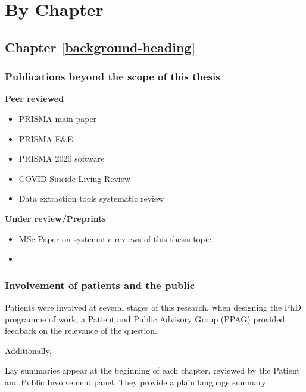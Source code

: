 \documentclass[a4paper, twoside]{templates/ociamthesis}
\begin{document}
\startappendices

\hypertarget{chapter-appendix-heading}{%
\chapter{By Chapter}\label{chapter-appendix-heading}}

\hypertarget{appendix-into}{%
\section{Chapter \ref{background-heading}}\label{appendix-into}}

\hypertarget{appendix-publications}{%
\subsection{Publications beyond the scope of this thesis}\label{appendix-publications}}

\textbf{Peer reviewed}

\begin{itemize}
\item
  PRISMA main paper
\item
  PRISMA E\&E
\item
  PRISMA 2020 software
\item
  COVID Suicide Living Review
\item
  Data extraction tools systematic review
\end{itemize}

\textbf{Under review/Preprints}

\begin{itemize}
\item
  MSc Paper on systematic reviews of this thesis topic
\item
\end{itemize}

\hypertarget{appendix-ppi}{%
\subsection{Involvement of patients and the public}\label{appendix-ppi}}

Patients were involved at several stages of this research. when designing the PhD programme of work, a Patient and Public Advisory Group (PPAG) provided feedback on the relevance of the question.

Additionally,

Lay summaries appear at the beginning of each chapter, reviewed by the Patient and Public Involvement panel. They provide a plain language summary
\end{document}
